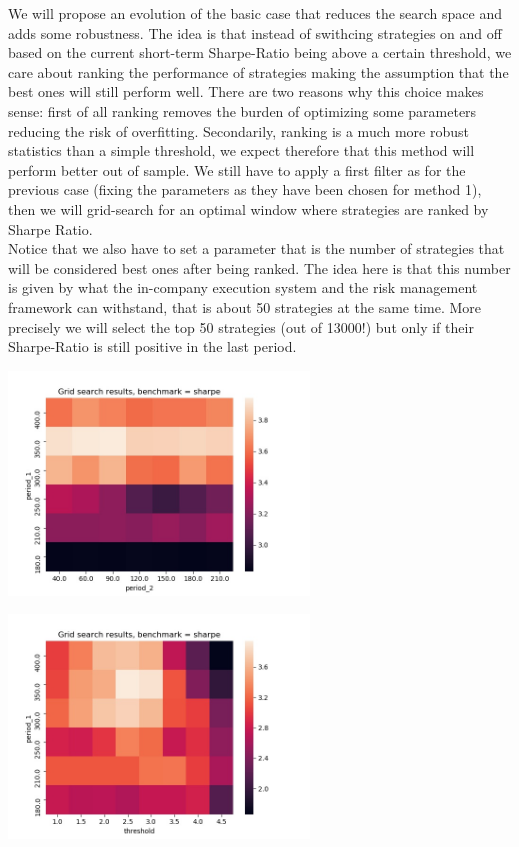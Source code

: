 We will propose an evolution of the basic case that reduces the search space and adds some robustness. The idea is that instead of swithcing strategies on and off based on the current short-term Sharpe-Ratio being above a certain threshold, we care about ranking the performance of strategies making the assumption that the best ones will still perform well. There are two reasons why this choice makes sense: first of all ranking removes the burden of optimizing some parameters reducing the risk of overfitting. Secondarily, ranking is a much more robust statistics than a simple threshold, we expect therefore that this method will perform better out of sample. We still have to apply a first filter as for the previous case (fixing the parameters as they have been chosen for method 1), then we will grid-search for an optimal window where strategies are ranked by Sharpe Ratio.\\
Notice that we also have to set a parameter that is the number of strategies that will be considered best ones after being ranked. The idea here is that this number is given by what the in-company execution system and the risk management framework can withstand, that is about 50 strategies at the same time. More precisely we will select the top 50 strategies (out of 13000!) but only if their Sharpe-Ratio is still positive in the last period.

\begin{center}
	\centering
    \includegraphics[width=0.6\textwidth]{GridSearches/Sharpe_Ranking/Figure_1.jpeg}
	\label{Sharpe_Ranking_1}
\end{center}

\begin{center}
	\centering
	\includegraphics[width=0.6\textwidth]{GridSearches/Sharpe_Ranking/Figure_2.jpeg}
	\label{Sharpe_Ranking_2}
\end{center}

